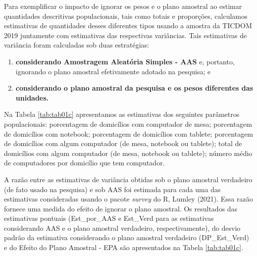 \documentclass[
  12pt,
  brazilian,
]{book}
\theoremstyle{definition}
\theoremstyle{definition}
\theoremstyle{definition}
\theoremstyle{definition}
\theoremstyle{remark}
\begin{document}
Para exemplificar o impacto de ignorar os pesos e o plano amostral ao estimar quantidades descritivas populacionais, tais como totais e proporções, calculamos estimativas de quantidades desses diferentes tipos usando a amostra da TICDOM 2019 juntamente com estimativas das respectivas variâncias. Tais estimativas de variância foram calculadas sob duas estratégias:

\begin{enumerate}
\def\labelenumi{\alph{enumi})}
\item
  \textbf{considerando Amostragem Aleatória Simples - AAS} e, portanto, ignorando o plano amostral efetivamente adotado na pesquisa; e
\item
  \textbf{considerando o plano amostral da pesquisa e os pesos diferentes das unidades.}
\end{enumerate}

Na Tabela \ref{tab:tab01c} apresentamos as estimativas dos seguintes parâmetros populacionais: porcentagem de domicílios com computador de mesa; porcentagem de domicílios com notebook; porcentagem de domicílios com tablete; porcentagem de domicílios com algum computador (de mesa, notebook ou tablete); total de domicílios com algum computador (de mesa, notebook ou tablete); número médio de computadores por domicílio que tem computador.

A razão entre as estimativas de variância obtidas sob o plano amostral verdadeiro (de fato usado na pesquisa) e sob AAS foi estimada para cada uma das estimativas consideradas usando o pacote \emph{survey} do R, Lumley (2021). Essa razão fornece uma medida do efeito de ignorar o plano amostral. Os resultados das estimativas pontuais (Est\_por\_AAS e Est\_Verd para as estimativas considerando AAS e o plano amostral verdadeiro, respectivamente), do desvio padrão da estimativa considerando o plano amostral verdadeiro (DP\_Est\_Verd) e do Efeito do Plano Amostral - EPA são apresentados na Tabela \ref{tab:tab01c}.
\end{document}
